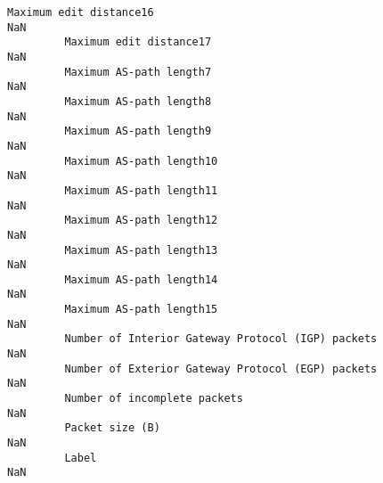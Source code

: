 \documentclass[11pt]{article}
\begin{document}
\begin{Verbatim}[commandchars=\\\{\}]
         Maximum edit distance16                                                          NaN   
         Maximum edit distance17                                                          NaN   
         Maximum AS-path length7                                                          NaN   
         Maximum AS-path length8                                                          NaN   
         Maximum AS-path length9                                                          NaN   
         Maximum AS-path length10                                                         NaN   
         Maximum AS-path length11                                                         NaN   
         Maximum AS-path length12                                                         NaN   
         Maximum AS-path length13                                                         NaN   
         Maximum AS-path length14                                                         NaN   
         Maximum AS-path length15                                                         NaN   
         Number of Interior Gateway Protocol (IGP) packets                                NaN   
         Number of Exterior Gateway Protocol (EGP) packets                                NaN   
         Number of incomplete packets                                                     NaN   
         Packet size (B)                                                                  NaN   
         Label                                                                            NaN   
         

\end{Verbatim}
\end{document}

